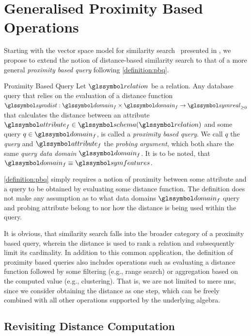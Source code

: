 \section{Generalised Proximity Based Operations}
\label{section:generalised_proximity_based_ops}

Starting with the vector space model for similarity search~\cite{Zezula:2006Similarity} presented in , we propose to extend the notion of distance-based similarity search to that of a more general \emph{proximity based query} following \cref{definition:pbq}.

\begin{definition}[label=definition:pbq]{Proximity Based Query}{}
    Let $\relation$ be a relation. Any database query that relies on the evaluation of a distance function $\symdist: \domain_{f} \times \domain_{f} \rightarrow \symreal_{\geq 0}$ that calculates the distance between an attribute $\attribute_{f} \in \schema(\relation)$ and some query $q \in \domain_f$, is called a \emph{proximity based query}. We call $q$ the \emph{query} and $\attribute_{f}$ the \emph{probing argument}, which both share the same \emph{query data domain} $\domain_f$. It is to be noted, that $\domain_f \equiv \symfeatures$. 
\end{definition}

\cref{definition:pbq} simply requires a notion of proximity between some attribute and a query to be obtained by evaluating some distance function. The definition does not make any assumption as to what data domains $\domain_f$ query and probing attribute belong to nor how the distance is being used within the query. 

It is obvious, that similarity search falls into the broader category of a proximity based query, wherein the distance is used to rank a relation and subsequently limit its cardinality. In addition to this common application, the definition of proximity based queries also includes operations such as evaluating a distance function followed by some filtering (e.g., range search) or aggregation based on the computed value (e.g., clustering). That is, we are not limited to mere \acrshort{nns}, since we consider obtaining the distance as one step, which can be freely combined with all other operations supported by the underlying algebra.

\subsection{Revisiting Distance Computation}

